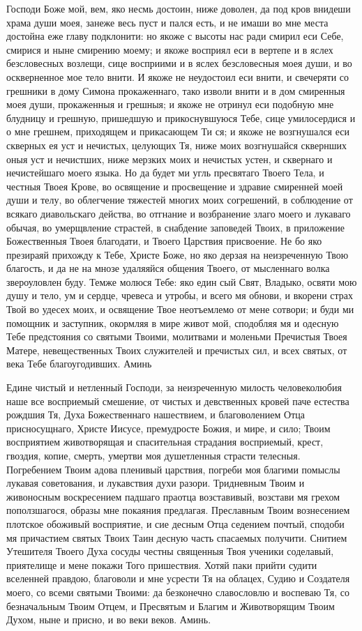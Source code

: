 Господи Боже мой, вем, яко несмь достоин, ниже доволен, да под кров внидеши храма души моея, занеже весь пуст и пался есть, и не имаши во мне места достойна еже главу подклонити: но якоже с высоты нас ради смирил еси Себе, смирися и ныне смирению моему; и якоже восприял еси в вертепе и в яслех безсловесных возлещи, сице восприими и в яслех безсловесныя моея души, и во оскверненное мое тело внити. И якоже не неудостоил еси внити, и свечеряти со грешники в дому Симона прокаженнаго, тако изволи внити и в дом смиренныя моея души, прокаженныя и грешныя; и якоже не отринул еси подобную мне блудницу и грешную, пришедшую и прикоснувшуюся Тебе, сице умилосердися и о мне грешнем, приходящем и прикасающем Ти ся; и якоже не возгнушался еси скверных ея уст и нечистых, целующих Тя, ниже моих возгнушайся сквернших оныя уст и нечистших, ниже мерзких моих и нечистых устен, и сквернаго и нечистейшаго моего языка. Но да будет ми угль пресвятаго Твоего Тела, и честныя Твоея Крове, во освящение и просвещение и здравие смиренней моей души и телу, во облегчение тяжестей многих моих согрешений, в соблюдение от всякаго диавольскаго действа, во отгнание и возбранение злаго моего и лукаваго обычая, во умерщвление страстей, в снабдение заповедей Твоих, в приложение Божественныя Твоея благодати, и Твоего Царствия присвоение. Не бо яко презираяй прихожду к Тебе, Христе Боже, но яко дерзая на неизреченную Твою благость, и да не на мнозе удаляяйся общения Твоего, от мысленнаго волка звероуловлен буду. Темже молюся Тебе: яко един сый Свят, Владыко, освяти мою душу и тело, ум и сердце, чревеса и утробы, и всего мя обнови, и вкорени страх Твой во удесех моих, и освящение Твое неотъемлемо от мене сотвори; и буди ми помощник и заступник, окормляя в мире живот мой, сподобляя мя и одесную Тебе предстояния со святыми Твоими, молитвами и моленьми Пречистыя Твоея Матере, невещественных Твоих служителей и пречистых сил, и всех святых, от века Тебе благоугодивших. Аминь




Едине чистый и нетленный Господи, за неизреченную милость человеколюбия наше все восприемый смешение, от чистых и девственных кровей паче естества рождшия Тя, Духа Божественнаго нашествием, и благоволением Отца присносущнаго, Христе Иисусе, премудросте Божия, и мире, и сило; Твоим восприятием животворящая и спасительная страдания восприемый, крест, гвоздия, копие, смерть, умертви моя душетленныя страсти телесныя. Погребением Твоим адова пленивый царствия, погреби моя благими помыслы лукавая советования, и лукавствия духи разори. Тридневным Твоим и живоносным воскресением падшаго праотца возставивый, возстави мя грехом поползшагося, образы мне покаяния предлагая. Преславным Твоим вознесением плотское обоживый восприятие, и сие десным Отца седением почтый, сподоби мя причастием святых Твоих Таин десную часть спасаемых получити. Снитием Утешителя Твоего Духа сосуды честны священныя Твоя ученики соделавый, приятелище и мене покажи Того пришествия. Хотяй паки прийти судити вселенней правдою, благоволи и мне усрести Тя на облацех, Судию и Создателя моего, со всеми святыми Твоими: да безконечно славословлю и воспеваю Тя, со безначальным Твоим Отцем, и Пресвятым и Благим и Животворящим Твоим Духом, ныне и присно, и во веки веков. Аминь.


